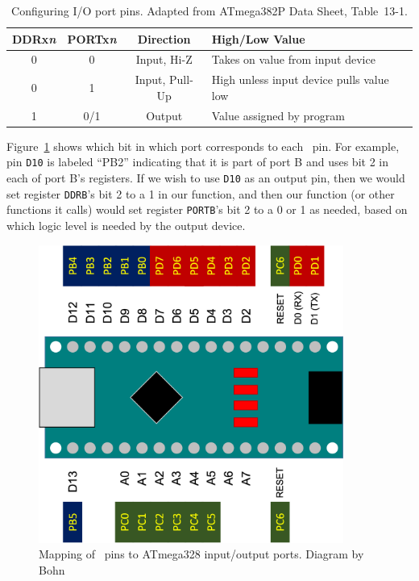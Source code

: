 \begin{table}
    \centering
    \begin{tabular}{|c|c|c|l|}
        \hline
        \textbf{DDRx\textit{n}} & \textbf{PORTx\textit{n}} & \textbf{Direction} & \textbf{High/Low Value} \\ \hline \hline
        0 & 0   & Input, Hi-Z       & Takes on value from input device \\
        0 & 1   & Input, Pull-Up    & High unless input device pulls value low \\
        1 & 0/1 & Output            & Value assigned by program \\ \hline
    \end{tabular}
    \caption{Configuring I/O port pins. \tiny Adapted from ATmega382P Data Sheet, Table~13-1. \label{table:DataDirection}}
\end{table}

Figure~\ref{fig:NanoPinMapping} shows which bit in which port corresponds to
each \nano\ pin. For example, pin \texttt{D10} is labeled ``PB2'' indicating
that it is part of port B and uses bit 2 in each of port B's registers. If we
wish to use \texttt{D10} as an output pin, then we would set register
\texttt{DDRB}'s bit 2 to a 1 in our  function, and then our
 function (or other functions it calls) would set register
\texttt{PORTB}'s bit 2 to a 0 or 1 as needed, based on which logic level is
needed by the output device.

\begin{figure}
    \centering
    \includegraphics[width=10cm]{NanoPinMapping}
    \caption{Mapping of \nano\ pins to ATmega328 input/output ports. \tiny Diagram by Bohn \label{fig:NanoPinMapping}}
\end{figure}

